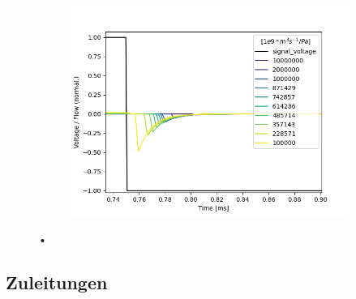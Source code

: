 \documentclass[fontsize=12pt, a4paper]{scrartcl}
\begin{document}
\begin{figure}[H]
	\centering
	\begin{subfigure}[H]{0.48\textwidth}
		\includegraphics[width=\textwidth, valign=t]{bilder/leakage/leakage_in_branch_multiweep_flow.png}
	\end{subfigure}
	\caption{•}
\end{figure}

\subsection{Zuleitungen}
\end{document}
